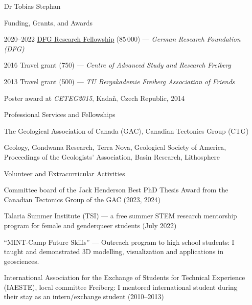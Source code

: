 \documentclass[10pt, paper=letter]{scrartcl} %
\begin{document}
\begin{cv}{Dr Tobias Stephan}
\begin{cvlist}{Funding, Grants, and Awards}
        \item[Grants] 2020--2022 \href{https://gepris.dfg.de/gepris/projekt/439621066?language=en}{DFG Research Fellowship} (85\,000\texteuro) --- \textit{German Research Foundation (DFG)} 
        \item[] 2016 Travel grant (750\texteuro) --- \textit{Centre of Advanced Study and Research Freiberg}
        \item 2013 Travel grant (500\texteuro) --- \textit{TU Bergakademie Freiberg Association of Friends}
        \item[Awards] Poster award at \textit{CETEG2015}, Kada\v{n}, Czech Republic, 2014

    \end{cvlist}
    
\begin{cvlist}{Professional Services and Fellowships}
    \item[Memberships] The Geological Association of Canada (GAC), Canadian Tectonics Group (CTG)%
    \item[Reviewer for journals] Geology, Gondwana Research, Terra Nova, Geological Society of America, Proceedings of the Geologists' Association, Basin Research, Lithosphere
\end{cvlist} 

\begin{cvlist}{Volunteer and Extracurricular Activities}
 \item Committee board of the Jack Henderson Best PhD Thesis Award from the Canadian Tectonics Group of the GAC (2023, 2024)
 \item Talaria Summer Institute (TSI) --- a free summer STEM research mentorship program for female and genderqueer students (July 2022)
 \item  \enquote{MINT-Camp Future Skills} --- Outreach program to high school students: I taught and demonstrated 3D modelling, visualization and applications in geosciences.
 \item International Association for the Exchange of Students for Technical Experience (IAESTE), local committee Freiberg: I mentored international student during their stay as an intern/exchange student (2010--2013)
\end{cvlist}


\end{cv}
\end{document}
